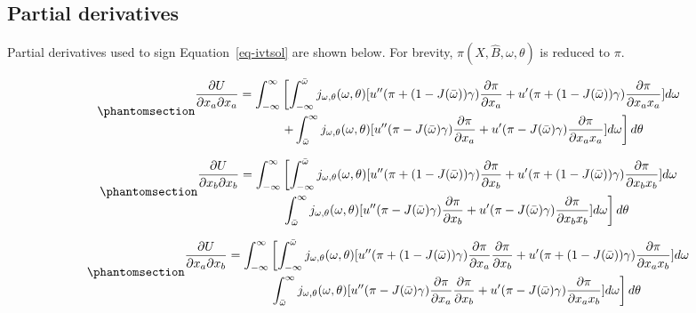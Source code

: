 \documentclass[
  letterpaper,
  DIV=11,
  numbers=noendperiod]{scrartcl}
\theoremstyle{plain}
\theoremstyle{plain}
\theoremstyle{remark}
\begin{document}
\subsection{Partial derivatives}\label{sec-partial}

Partial derivatives used to sign Equation~\ref{eq-ivtsol} are shown
below. For brevity, \(\pi(X,\hat B,\omega,\theta)\) is reduced to
\(\pi\).

\begin{equation}\phantomsection\label{eq-kk}{
\begin{aligned}
\frac{\partial U}{\partial x_a \partial x_a}=\int^\infty_{-\infty}&\left[ \int^{\bar \omega}_{-\infty}j_{\omega,\theta}(\omega,\theta)[u''(\pi+(1-J(\bar \omega))\gamma)\frac{\partial\pi}{\partial x_a}+u'(\pi+(1-J(\bar \omega))\gamma)\frac{\partial \pi}{\partial x_a x_a}]d\omega \right. \\
&\left. +\int^\infty_{\bar \omega}j_{\omega,\theta}(\omega,\theta)[u''(\pi-J(\bar \omega)\gamma)\frac{\partial\pi}{\partial x_a}+u'(\pi-J(\bar \omega)\gamma)\frac{\partial \pi}{\partial x_a x_a}]d\omega\right]d\theta
\end{aligned}
}\end{equation}

\begin{equation}\phantomsection\label{eq-ll}{
\begin{aligned}
\frac{\partial U}{\partial x_b \partial x_b}=\int^\infty_{-\infty}&\left[ \int^{\bar \omega}_{-\infty}j_{\omega,\theta}(\omega,\theta)[u''(\pi+(1-J(\bar \omega))\gamma)\frac{\partial\pi}{\partial x_b}+u'(\pi+(1-J(\bar \omega))\gamma)\frac{\partial \pi}{\partial x_b x_b}]d\omega \right. \\
&\left.\int^\infty_{\bar \omega}j_{\omega,\theta}(\omega,\theta)[u''(\pi-J(\bar \omega)\gamma)\frac{\partial\pi}{\partial x_b}+u'(\pi-J(\bar \omega)\gamma)\frac{\partial \pi}{\partial x_b x_b}]d\omega\right]d\theta
\end{aligned}
}\end{equation}

\begin{equation}\phantomsection\label{eq-crossl}{
\begin{aligned}
\frac{\partial U}{\partial x_a \partial x_b}=\int^\infty_{-\infty}&\left[ \int^{\bar \omega}_{-\infty}j_{\omega,\theta}(\omega,\theta)[u''(\pi+(1-J(\bar \omega))\gamma)\frac{\partial\pi}{\partial x_a}\frac{\partial \pi}{\partial x_b}+u'(\pi+(1-J(\bar \omega))\gamma)\frac{\partial \pi}{\partial x_a x_b}]d\omega \right. \\
& \left.\int^\infty_{\bar \omega}j_{\omega,\theta}(\omega,\theta)[u''(\pi-J(\bar \omega)\gamma)\frac{\partial\pi}{\partial x_a}\frac{\partial \pi}{\partial x_b}+u'(\pi-J(\bar \omega)\gamma)\frac{\partial \pi}{\partial x_a x_b}]d\omega\right]d\theta
\end{aligned}
}\end{equation}
\end{document}

